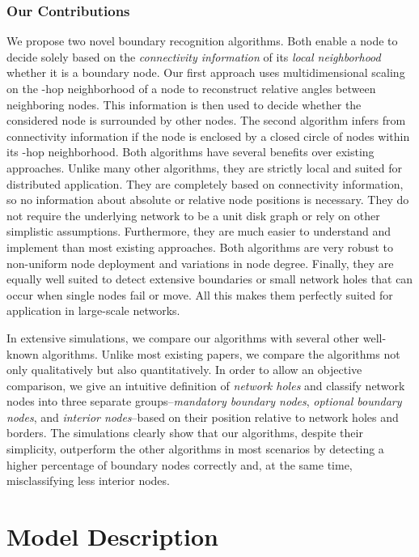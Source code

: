 \documentclass{llncs}
\begin{document}
\subsubsection{Our Contributions}
We propose two novel boundary recognition algorithms.
Both enable a node to decide solely based on the \emph{connectivity information} of its \emph{local neighborhood} whether it is a boundary node.
Our first approach uses multidimensional scaling on the -hop neighborhood of a node to reconstruct relative angles between neighboring nodes.
This information is then used to decide whether the considered node is surrounded by other nodes.
The second algorithm infers from connectivity information if the node is enclosed by a closed circle of nodes within its -hop neighborhood.
Both algorithms have several benefits over existing approaches.
Unlike many other algorithms, they are strictly local and suited for distributed application.
They are completely based on connectivity information, so no information about absolute or relative node positions is necessary.
They do not require the underlying network to be a unit disk graph or rely on other simplistic assumptions.
Furthermore, they are much easier to understand and implement than most existing approaches.
Both algorithms are very robust to non-uniform node deployment and variations in node degree.
Finally, they are equally well suited to detect extensive boundaries or small network holes that can occur when single nodes fail or move.
All this makes them perfectly suited for application in large-scale networks.
    
In extensive simulations, we compare our algorithms with several other well-known algorithms.
Unlike most existing papers, we compare the algorithms not only qualitatively but also quantitatively.
In order to allow an objective comparison, we give an intuitive definition of \emph{network holes} and classify network nodes into three separate groups--\emph{mandatory boundary nodes}, \emph{optional boundary nodes}, and \emph{interior nodes}--based on their position relative to network holes and borders.
The simulations clearly show that our algorithms, despite their simplicity, outperform the other algorithms in most scenarios by detecting a higher percentage of boundary nodes correctly and, at the same time, misclassifying less interior nodes.


\section{Model Description}\label{sec:model}
\end{document}
